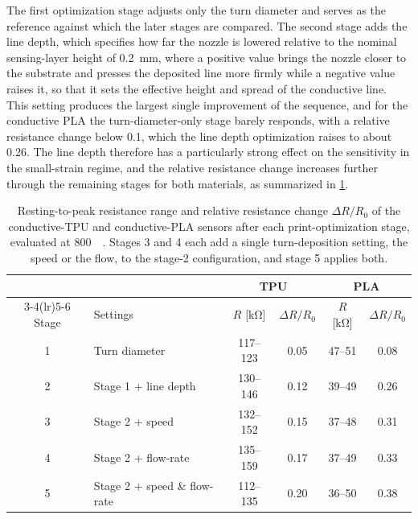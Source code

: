 The first optimization stage adjusts only the turn diameter and serves as the reference against which the later stages are compared. The second stage adds the line depth, which specifies how far the nozzle is lowered relative to the nominal sensing-layer height of \SI{0.2}{\milli\meter}, where a positive value brings the nozzle closer to the substrate and presses the deposited line more firmly while a negative value raises it, so that it sets the effective height and spread of the conductive line. This setting produces the largest single improvement of the sequence, and for the conductive PLA the turn-diameter-only stage barely responds, with a relative resistance change below \num{0.1}, which the line depth optimization raises to about \num{0.26}. The line depth therefore has a particularly strong effect on the sensitivity in the small-strain regime, and the relative resistance change increases further through the remaining stages for both materials, as summarized in \cref{tab:opt_results}.

\begin{table}
\centering
\caption{Resting-to-peak resistance range and relative resistance change $\Delta R/R_0$ of the conductive-TPU and conductive-PLA sensors after each print-optimization stage, evaluated at \SI{800}{\micro\strain}. Stages 3 and 4 each add a single turn-deposition setting, the speed or the flow, to the stage-2 configuration, and stage 5 applies both.}
\label{tab:opt_results}
\begin{tabular}{@{}c l c c c c@{}}
\toprule
 & & \multicolumn{2}{c}{TPU} & \multicolumn{2}{c}{PLA} \\
\cmidrule(lr){3-4}\cmidrule(lr){5-6}
Stage & Settings & $R$ [\si{\kilo\ohm}] & $\Delta R/R_0$ & $R$ [\si{\kilo\ohm}] & $\Delta R/R_0$ \\
\midrule
1 & Turn diameter  & 117--123 & 0.05 & 47--51 & 0.08 \\
2 & Stage 1 + line depth     & 130--146 & 0.12 & 39--49 & 0.26 \\
3 & Stage 2 + speed          & 132--152 & 0.15 & 37--48 & 0.31 \\
4 & Stage 2 + flow-rate      & 135--159 & 0.17 & 37--49 & 0.33 \\
5 & Stage 2 + speed \& flow-rate & 112--135 & 0.20 & 36--50 & 0.38 \\
\bottomrule
\end{tabular}
\end{table}

